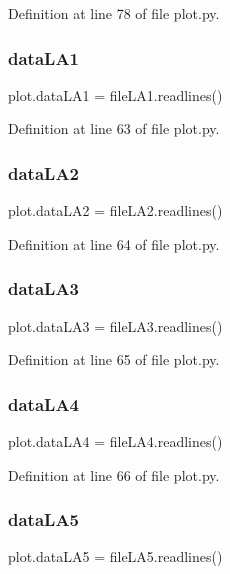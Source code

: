 Definition at line 78 of file plot.\+py.

\mbox{\label{namespaceplot_a3faf5da8f0de4a7a8247af5efd48471d}} 
\subsubsection{data\+L\+A1}
{\footnotesize\ttfamily plot.\+data\+L\+A1 = file\+L\+A1.\+readlines()}



Definition at line 63 of file plot.\+py.

\mbox{\label{namespaceplot_a5e2ad7ac7c2c5cfaf6d79632fa3e1fc4}} 
\subsubsection{data\+L\+A2}
{\footnotesize\ttfamily plot.\+data\+L\+A2 = file\+L\+A2.\+readlines()}



Definition at line 64 of file plot.\+py.

\mbox{\label{namespaceplot_a3872806eaef87ca6b0ba1a1d6543b2f2}} 
\subsubsection{data\+L\+A3}
{\footnotesize\ttfamily plot.\+data\+L\+A3 = file\+L\+A3.\+readlines()}



Definition at line 65 of file plot.\+py.

\mbox{\label{namespaceplot_aaee718baa7e70f093f3481bf80f2c480}} 
\subsubsection{data\+L\+A4}
{\footnotesize\ttfamily plot.\+data\+L\+A4 = file\+L\+A4.\+readlines()}



Definition at line 66 of file plot.\+py.

\mbox{\label{namespaceplot_a8e6e4c2dd6340467e5c36c9c455a3925}} 
\subsubsection{data\+L\+A5}
{\footnotesize\ttfamily plot.\+data\+L\+A5 = file\+L\+A5.\+readlines()}



